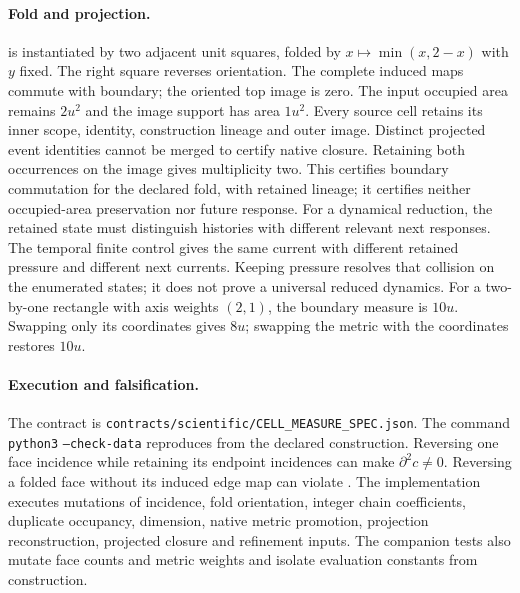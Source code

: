 \paragraph{Fold and projection.}
 is instantiated by two
adjacent unit squares, folded by \(x\mapsto\min(x,2-x)\) with \(y\) fixed.
The right square reverses orientation. The complete induced maps commute with
boundary; the oriented top image is zero. The input occupied area remains
\(2u^2\) and the image support has area \(1u^2\). Every source cell retains
its inner scope, identity, construction lineage and outer image. Distinct
projected event identities cannot be merged to certify native closure.
Retaining both occurrences on the image gives multiplicity two.
This certifies boundary commutation for the declared fold, with retained
lineage; it certifies neither occupied-area preservation nor future response.
For a dynamical reduction, the retained state must distinguish histories with
different relevant next responses. The temporal finite control gives the same
current with different retained pressure and different next currents. Keeping
pressure resolves that collision on the enumerated states; it does not prove
a universal reduced dynamics.
For a two-by-one rectangle with axis weights \((2,1)\), the boundary measure
is \(10u\). Swapping only its coordinates gives \(8u\); swapping the metric
with the coordinates restores \(10u\).

\paragraph{Execution and falsification.}
The contract is \texttt{contracts/scientific/CELL\_MEASURE\_SPEC.json}.
The command
\texttt{python3}  \texttt{--check-data}
reproduces  from the declared
construction. Reversing one face incidence while retaining its endpoint
incidences can make \(\partial^2c\ne0\). Reversing a folded face without
its induced edge map can violate .
The implementation executes mutations of incidence, fold orientation, integer
chain coefficients, duplicate
occupancy, dimension, native metric promotion, projection reconstruction,
projected closure and refinement inputs. The companion tests also mutate face
counts and metric weights and isolate evaluation constants from construction.
